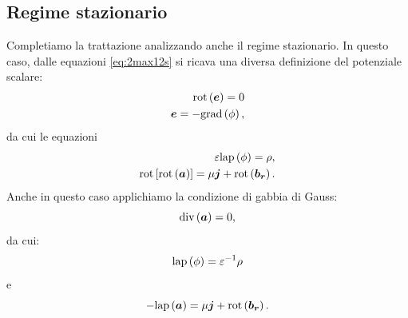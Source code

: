 \subsection{Regime stazionario}
Completiamo la trattazione analizzando anche il regime stazionario. In questo caso, dalle equazioni \eqref{eq:2max12s} si ricava una diversa definizione del potenziale scalare:
\begin{align}
\label{eq:2pot1s}
\text{rot}\left(\boldsymbol{e}\right)=0\nonumber\\
\boldsymbol{e} = - \text{grad}\left(\phi\right),
\end{align}
da cui le equazioni
\begin{align}
\label{eq:2pot2s}
\varepsilon \text{lap}\left(\phi\right) = \rho,\\
\text{rot} \left[\text{rot}\left(\boldsymbol{a}\right) \right] = \mu\boldsymbol{j}+\text{rot}\left(\boldsymbol{b_r}\right).
\end{align}
Anche in questo caso applichiamo la condizione di gabbia di Gauss:
\begin{equation}
\label{eq:2gaussgauge2}
\text{div}\left(\boldsymbol{a}\right) = 0,
\end{equation}
da cui:
\begin{equation}
\label{eq:2pot3qs2}
\text{lap}\left({\phi}\right) = \varepsilon^{-1} \rho
\end{equation}
e
\begin{equation}
\label{eq:2pot4qs2}
-\text{lap}\left(\boldsymbol{a}\right) = \mu\boldsymbol{j}+\text{rot}\left(\boldsymbol{b_r}\right).
\end{equation}